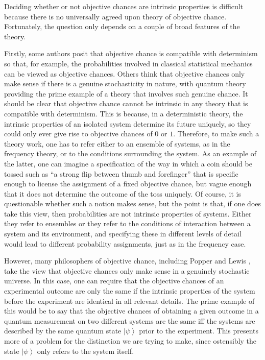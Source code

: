 \documentclass[DIV=calc,paper=a4,fontsize=11pt,twocolumn]{scrartcl} %
\theoremstyle{definition}
\theoremstyle{plain}
\newcommand{\Ket}[1]{\ensuremath{\left \vert #1 \right \rangle}}
\begin{document}
Deciding whether or not objective chances are intrinsic properties is
difficult because there is no universally agreed upon theory of
objective chance.  Fortunately, the question only depends on a couple
of broad features of the theory.

Firstly, some authors posit that objective chance is compatible with
determinism so that, for example, the probabilities involved in
classical statistical mechanics can be viewed as objective chances.
Others think that objective chances only make sense if there is a
genuine stochasticity in nature, with quantum theory providing the
prime example of a theory that involves such genuine chance.  It
should be clear that objective chance cannot be intrinsic in any
theory that is compatible with determinism.  This is because, in a
deterministic theory, the intrinsic properties of an isolated system
determine its future uniquely, so they could only ever give rise to
objective chances of $0$ or $1$.  Therefore, to make such a theory
work, one has to refer either to an ensemble of systems, as in the
frequency theory, or to the conditions surrounding the system.  As an
example of the latter, one can imagine a specification of the way in
which a coin should be tossed such as ``a strong flip between thumb
and forefinger'' that is specific enough to license the assignment of
a fixed objective chance, but vague enough that it does not determine
the outcome of the toss uniquely.  Of course, it is questionable
whether such a notion makes sense, but the point is that, if one does
take this view, then probabilities are not intrinsic properties of
systems.  Either they refer to ensembles or they refer to the
conditions of interaction between a system and its environment, and
specifying these in different levels of detail would lead to
different probability assignments, just as in the frequency case.

However, many philosophers of objective chance, including Popper
\cite{Popper2011} and Lewis \cite{Lewis2011}, take the view that
objective chances only make sense in a genuinely stochastic universe.
In this case, one can require that the objective chances of an
experimental outcome are only the same if the intrinsic properties of
the system before the experiment are identical in all relevant
details.  The prime example of this would be to say that the objective
chances of obtaining a given outcome in a quantum measurement on two
different systems are the same iff the systems are described by the
same quantum state $\Ket{\psi}$ prior to the experiment.  This
presents more of a problem for the distinction we are trying to make,
since ostensibly the state $\Ket{\psi}$ only refers to the system
itself.
\end{document}
